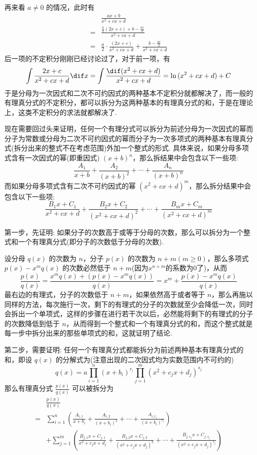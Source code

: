 再来看 $a \neq 0$ 的情况，此时有
\begin{align*}
    & \frac{ax+b}{x^2+cx+d} \\
    = & \frac{\frac{a}{2}(2x+c)+b-\frac{ac}{2}}{x^2+cx+d} \\
    = & \frac{a}{2} \cdot \frac{(2x+c)}{x^2+cx+d} + \frac{b-\frac{ac}{2}}{x^2+cx+d}
\end{align*}
后一项的不定积分刚刚已经讨论过了，对于前一项，有
\[ \int \frac{2x+c}{x^2+cx+d} \dif x = \int \frac{\dif (x^2+cx+d)}{x^2+cx+d} = \ln{(x^2+cx+d)} + C \]
于是分母为一次因式和二次不可约因式的两种基本不定积分就都解决了，而一般的有理真分式的不定积分，都可以拆分为这两种基本的有理真分式的和，于是在理论上，这类不定积分的求法就都解决了.

现在需要回过头来证明，任何一个有理分式可以拆分为前述分母为一次因式的幂而分子为常数或分母为二次不可约因式的幂而分子为一次多项式的两种基本有理真分式(拆分出来的整式不在考虑范围)外加一个整式的形式. 具体来说，如果分母多项式含有一次因式的幂(即重因式) $(x+b)^n$，那么拆结果中会包含以下一些项:
\[ \frac{A_{1}}{x+b} + \frac{A_{2}}{(x+b)^{2}} + \cdots + \frac{A_{n}}{(x+b)^n} \]
而如果分母多项式含有二次不可约因式的幂 $(x^2+cx+d)^m$，那么拆分结果中会包含以下一些项:
\[ \frac{B_{1}x+C_{1}}{x^2+cx+d} + \frac{B_{2}x+C_{2}}{(x^2+cx+d)^{2}} + \cdots + \frac{B_{m}x+C_{m}}{(x^2+cx+d)^{m}} \]

第一步，先证明: 如果分子的次数高于或等于分母的次数，那么可以拆分为一个整式和一个有理真分式(即分子的次数低于分母的次数).

设分母 $q(x)$ 的次数为 $n$，分子 $p(x)$ 的次数为 $n+m(m \geqslant 0)$，那么多项式 $p(x)-x^m q(x)$ 的次数必然低于 $n+m$(因为$x^{n+m}$的系数为0了)，从而
\[ \frac{p(x)}{q(x)} = \frac{x^m q(x) + (p(x)-x^m q(x))}{q(x)} = x^m + \frac{p(x)-x^m q(x)}{q(x)} \]
最右边的有理式，分子的次数低于 $n+m$，如果依然高于或者等于 $n$，那么再施以同样的方法，每次施行一次，剩下的有理式的分子的次数就至少会降低一次，同时会拆出一个单项式，这样的步骤在进行若干次以后，必然能将剩下的有理式的分子的次数降低到低于 $n$，从而得到一个整式和一个有理真分式的和，而这个整式就是每一步中拆分出来的那些单项式的和，这就证明了结论.

第二步，需要证明: 任何一个有理真分式都能拆分为前述两种基本有理真分式的和，即设 $q(x)$ 的分解式为(注意出现的二次因式均为实数范围内不可约的)
\[ q(x) = a \prod_{i=1}^n(x+b_i)^{r_i} \prod_{j=1}^m(x^2+c_j x + d_j)^{s_j} \]
那么有理真分式 $\frac{p(x)}{q(x)}$ 可以被拆分为
\begin{align*}
 & \frac{p(x)}{q(x)} \\
 = & \sum_{i=1}^{n} \left( \frac{A_{i,1}}{x+b_i} + \frac{A_{i,2}}{(x+b_i)^2} + \cdots + \frac{A_{i,r_i}}{(x+b_i)^{r_i}}  \right) \\
 & + \sum_{j=1}^m \left( \frac{B_{j,1}x+C_{j,1}}{x^2+c_j x + d_j} + \frac{B_{j,2}x+C_{j,2}}{(x^2+c_j x + d_j)^2} + \cdots + \frac{B_{j,s_j}x+C_{j,s_j}}{(x^2+c_j x + d_j)^{s_j}} \right)
\end{align*}

